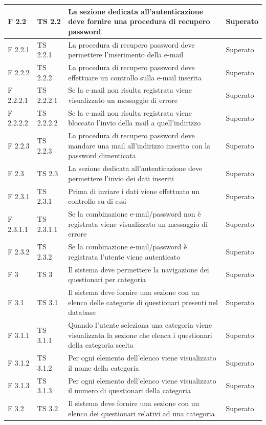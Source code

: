 \documentclass[a4paper,11pt]{article}
\begin{document}
\begin{longtable}{p{}p{}p{}p{}}
\midrule
F 2.2 &TS 2.2&La sezione dedicata all'autenticazione deve fornire una procedura di recupero password & Superato\\
\midrule
F 2.2.1 &TS 2.2.1&La procedura di recupero password deve permettere l'inserimento della e-mail & Superato\\
\midrule
F 2.2.2 &TS 2.2.2&La procedura di recupero password deve effettuare un controllo sulla e-mail inserita & Superato\\
\midrule
F 2.2.2.1 &TS 2.2.2.1&Se la e-mail non risulta registrata viene visualizzato un messaggio di errore & Superato\\
\midrule
F 2.2.2.2 & TS 2.2.2.2&Se la e-mail non risulta registrata viene bloccato l'invio della mail a quell'indirizzo & Superato\\
\midrule
F 2.2.3 & TS 2.2.3&La procedura di recupero password deve mandare una mail all'indirizzo inserito con la password dimenticata & Superato\\
\midrule
F 2.3 & TS 2.3&La sezione dedicata all'autenticazione deve permettere l'invio dei dati inseriti & Superato\\
\midrule
F 2.3.1 & TS 2.3.1&Prima di inviare i dati viene effettuato un controllo su di essi & Superato\\
\midrule
F 2.3.1.1 & TS 2.3.1.1 &Se la combinazione e-mail/password non è registrata viene visualizzato un messaggio di errore & Superato\\
\midrule
F 2.3.2 & TS 2.3.2 &Se la combinazione e-mail/password è registrata l'utente viene autenticato & Superato\\
\midrule
F 3 & TS 3 &Il sistema deve permettere la navigazione dei questionari per categoria & Superato\\
\midrule
F 3.1 & TS 3.1 &Il sistema deve fornire una sezione con un elenco delle categorie di questionari presenti nel database & Superato\\
\midrule
F 3.1.1 & TS 3.1.1 &Quando l'utente seleziona una categoria viene visualizzata la sezione che elenca i questionari della categoria scelta & Superato\\
\midrule
F 3.1.2 & TS 3.1.2 &Per ogni elemento dell'elenco viene visualizzato il nome della categoria & Superato\\
\midrule
F 3.1.3 & TS 3.1.3 &Per ogni elemento dell'elenco viene visualizzato il numero di questionari della categoria & Superato\\
\midrule
F 3.2 & TS 3.2 &Il sistema deve fornire una sezione con un elenco dei questionari relativi ad una categoria & Superato\\

\end{longtable}
\end{document}
